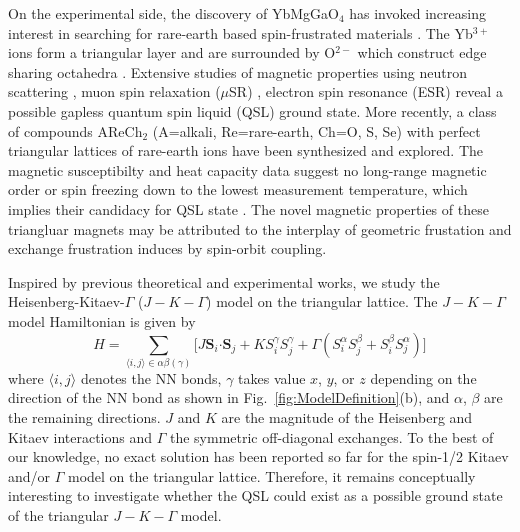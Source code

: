 \documentclass[aps,prb,reprint,amsfonts,amsmath,amssymb,showpacs,groupedaddress,superscriptaddress]{revtex4-1}
\begin{document}
On the experimental side, the discovery of YbMgGaO$_4$ has invoked increasing interest in searching for rare-earth based spin-frustrated materials \cite{srep16419,PhysRevLett.115.167203,PhysRevB.94.035107,PhysRevB.96.054445,PhysRevB.97.184413,PhysRevB.97.125105,PhysRevB.96.075105,PhysRevLett.119.157201}. The Yb$^{3+}$ ions form a triangular layer and are surrounded by O$^{2-}$ which construct edge sharing octahedra \cite{srep16419,PhysRevLett.115.167203}. Extensive studies of magnetic properties using neutron scattering \cite{Nature20614,nphys3971,PhysRevLett.117.267202,PhysRevX.8.031001}, muon spin relaxation ($\mu$SR) \cite{PhysRevLett.117.097201}, electron spin resonance (ESR) \cite{PhysRevLett.115.167203} reveal a possible gapless quantum spin liquid (QSL) ground state. More recently, a class of compounds AReCh$_2$ (A=alkali, Re=rare-earth, Ch=O, S, Se) with perfect triangular lattices of rare-earth ions have been synthesized and explored. The magnetic susceptibilty and heat capacity data suggest no long-range magnetic order or spin freezing down to the lowest measurement temperature, which implies their candidacy for QSL state \cite{acsmaterialslett.9b00464,PhysRevMaterials.3.114413,arXiv1911.08036,Liu_2018,arXiv1911.12712}. The novel magnetic properties of these triangluar magnets may be attributed to the interplay of geometric frustation and exchange frustration induces by spin-orbit coupling.

Inspired by previous theoretical and experimental works, we study the Heisenberg-Kitaev-$\Gamma$ ($J-K-\Gamma$) model on the triangular lattice. The $J-K-\Gamma$ model Hamiltonian is given by
\begin{equation}
    H=\sum_{\langle i,j \rangle \in \alpha \beta (\gamma)} \lbrack J \bm{S}_i \bm{\cdot} \bm{S}_j + K S_i^{\gamma} S_j^{\gamma} + \Gamma (S_i^{\alpha} S_j^{\beta} + S_i^{\beta} S_j^{\alpha}) \rbrack \label{eq:Hamiltonian}
\end{equation}
where $\langle i,j \rangle$ denotes the NN bonds, $\gamma$ takes value $x$, $y$, or $z$ depending on the direction of the NN bond as shown in Fig.~\ref{fig:ModelDefinition}(b), and $\alpha$, $\beta$ are the remaining directions. $J$ and $K$ are the magnitude of the Heisenberg and Kitaev interactions and $\Gamma$ the symmetric off-diagonal exchanges. To the best of our knowledge, no exact solution has been reported so far for the spin-1/2 Kitaev and/or $\Gamma$ model on the triangular lattice. Therefore, it remains conceptually interesting to investigate whether the QSL could exist as a possible ground state of the triangular $J-K-\Gamma$ model.
\end{document}
